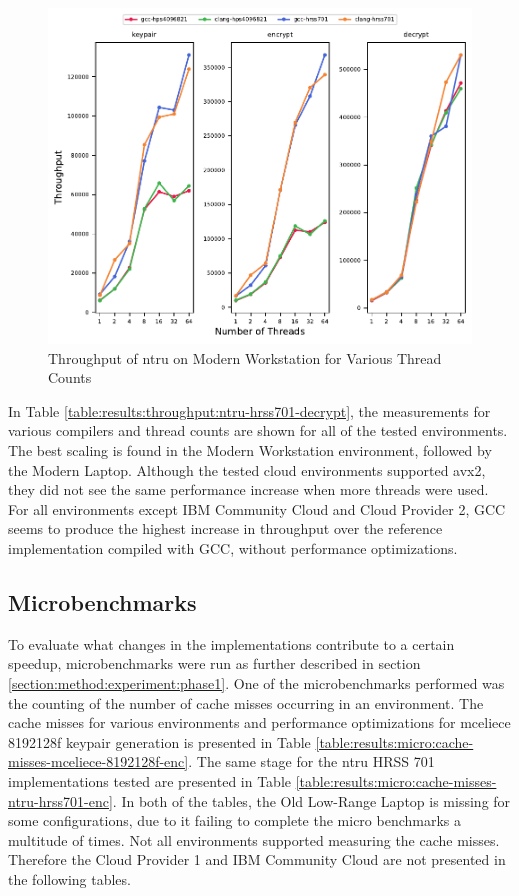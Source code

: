 \begin{figure}
    \centering
    \includegraphics[scale=0.75]{chapters/results/throughput/Modern Workstation_ntru.pdf}
    \caption{Throughput of \gls{ntru} on Modern Workstation for Various Thread Counts}
    \label{figure:results:throughput:ntru-modern-workstation}
\end{figure}

In Table \ref{table:results:throughput:ntru-hrss701-decrypt}, the measurements for various compilers and thread counts are shown for all of the tested environments. The best scaling is found in the Modern Workstation environment, followed by the Modern Laptop. Although the tested cloud environments supported \gls{avx2}, they did not see the same performance increase when more threads were used. For all environments except IBM Community Cloud and Cloud Provider 2, GCC seems to produce the highest increase in throughput over the reference implementation compiled with GCC, without performance optimizations.



\subsection{Microbenchmarks}

To evaluate what changes in the implementations contribute to a certain speedup, microbenchmarks were run as further described in section \ref{section:method:experiment:phase1}. One of the microbenchmarks performed was the counting of the number of cache misses occurring in an environment. The cache misses for various environments and performance optimizations for \gls{mceliece} 8192128f keypair generation is presented in Table \ref{table:results:micro:cache-misses-mceliece-8192128f-enc}. The same stage for the \gls{ntru} HRSS 701 implementations tested are presented in Table \ref{table:results:micro:cache-misses-ntru-hrss701-enc}. In both of the tables, the Old Low-Range Laptop is missing for some configurations, due to it failing to complete the micro benchmarks a multitude of times. Not all environments supported measuring the cache misses. Therefore the Cloud Provider 1 and IBM Community Cloud are not presented in the following tables.

